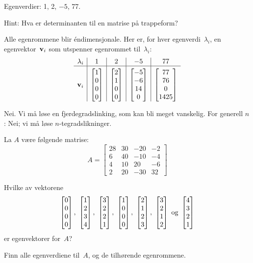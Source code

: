 \begin{losning}

\begin{punkt}
Egenverdier: 1, 2, $-5$, 77. 

\noindent
Hint: Hva er determinanten til en matrise på trappeform?
\end{punkt}

\begin{punkt}
Alle egenrommene blir éndimensjonale.  Her er, for hver
egenverdi~$\lambda_i$, en egenvektor~$\mathbf{v}_i$ som utspenner egenrommet
til~$\lambda_i$:
\[
\begin{array}{r|c|c|c|c}
\lambda_i &
1 & 2 & -5 & 77 \\ \hline
\rule{0pt}{30pt}
\v_i &
\vvvv{1}{0}{0}{0} &
\vvvv{2}{1}{0}{0} &
\vvvv{-5}{-6}{14}{0} &
\vvvv{77}{76}{0}{1425}
\end{array}
\]
\end{punkt}

\begin{punkt}
Nei. Vi må løse en fjerdegradslinking, som kan bli meget vanskelig. For generell $n$: Nei; vi må løse $n$-tegradslikninger.
\end{punkt}

\end{losning}


\begin{oppgave}
La $A$ være følgende matrise:
\[
A =
\begin{bmatrix}
 28 & 30 & -20 & -2 \\
 6 & 40 & -10 & -4 \\
 4 & 10 & 20 & -6 \\
 2 & 20 & -30 & 32
\end{bmatrix}
\]
\begin{punkt}
Hvilke av vektorene
\[
\vvvv{0}{0}{0}{0},\ %
\vvvv{1}{2}{3}{4},\ %
\vvvv{3}{2}{2}{1},\ %
\vvvv{1}{0}{0}{0},\ %
\vvvv{2}{1}{2}{3},\ %
\vvvv{3}{2}{1}{2}\ \text{og}\ %
\vvvv{4}{3}{2}{1}
\]
er egenvektorer for~$A$?
\end{punkt}
\begin{punkt}
Finn alle egenverdiene til~$A$, og de tilhørende egenrommene.
\end{punkt}
\end{oppgave}

